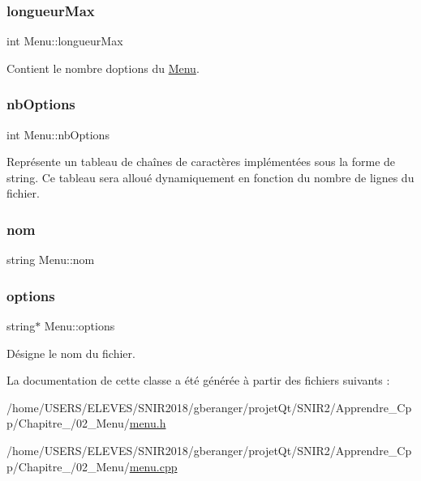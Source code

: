 \subsubsection{\texorpdfstring{longueur\+Max}{longueurMax}}
{\footnotesize\ttfamily int Menu\+::longueur\+Max\hspace{0.3cm}{\ttfamily [private]}}



Contient le nombre d\textquotesingle{}options du \hyperlink{class_menu}{Menu}. 

\mbox{\label{class_menu_ad59953635d184fefcddf95015a761187}} 
\subsubsection{\texorpdfstring{nb\+Options}{nbOptions}}
{\footnotesize\ttfamily int Menu\+::nb\+Options\hspace{0.3cm}{\ttfamily [private]}}



Représente un tableau de chaînes de caractères implémentées sous la forme de string. Ce tableau sera alloué dynamiquement en fonction du nombre de lignes du fichier. 

\mbox{\label{class_menu_a99574cb51606811f697854859bc1ccc1}} 
\subsubsection{\texorpdfstring{nom}{nom}}
{\footnotesize\ttfamily string Menu\+::nom\hspace{0.3cm}{\ttfamily [private]}}

\mbox{\label{class_menu_aec975cfea9216420d5754ce2e9321390}} 
\subsubsection{\texorpdfstring{options}{options}}
{\footnotesize\ttfamily string$\ast$ Menu\+::options\hspace{0.3cm}{\ttfamily [private]}}



Désigne le nom du fichier. 



La documentation de cette classe a été générée à partir des fichiers suivants \+:\begin{DoxyCompactItemize}
\item 
/home/\+U\+S\+E\+R\+S/\+E\+L\+E\+V\+E\+S/\+S\+N\+I\+R2018/gberanger/projet\+Qt/\+S\+N\+I\+R2/\+Apprendre\+\_\+\+Cpp/\+Chapitre\+\_/02\+\_\+\+Menu/\hyperlink{menu_8h}{menu.\+h}\item 
/home/\+U\+S\+E\+R\+S/\+E\+L\+E\+V\+E\+S/\+S\+N\+I\+R2018/gberanger/projet\+Qt/\+S\+N\+I\+R2/\+Apprendre\+\_\+\+Cpp/\+Chapitre\+\_/02\+\_\+\+Menu/\hyperlink{menu_8cpp}{menu.\+cpp}\end{DoxyCompactItemize}
